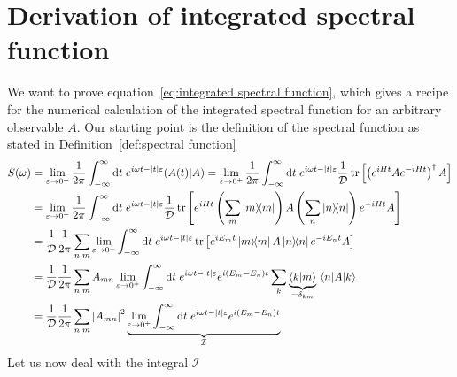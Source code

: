 \chapter{Derivation of integrated spectral function\label{app:spectral}}
\thispagestyle{chapterBeginStyle}
We want to prove equation~\eqref{eq:integrated spectral function}, which gives
a recipe for the numerical calculation of the integrated spectral function for an arbitrary observable \(A\).
Our starting point is the definition of the spectral function as stated in Definition~\ref{def:spectral function}
\begin{align}
        S(\omega) &=  \lim _{\varepsilon \to 0^+} \frac{1}{2 \pi} \int_{-\infty}^{\infty} \mathrm{d} t 
        \; e^{i \omega t-|t| \varepsilon}\hs{A(t)}{A} = \lim _{\varepsilon \to 0^+} \frac{1}{2 \pi}
        \int_{-\infty}^{\infty} \mathrm{d} t \; e^{i \omega t-|t| \varepsilon} \frac{1}{\dimension}
        \tr\left[\left(e^{iHt}Ae^{-iHt}\right)^{\dagger}A\right] \nonumber\\
        &=\lim _{\varepsilon \to 0^+} \frac{1}{2 \pi}
        \int_{-\infty}^{\infty} \mathrm{d} t \; e^{i \omega t-|t| \varepsilon} \frac{1}{\dimension}
        \tr\left[e^{iHt}\left(\sum_{m} \ketbra{m}{m}\right) 
        A\left(\sum_{n} \ketbra{n}{n}\right)e^{-iHt}A\right] \nonumber\\
        &= \frac{1}{\dimension} \frac{1}{2 \pi}\sum_{n,m} \lim _{\varepsilon \to 0^+} 
        \int_{-\infty}^{\infty} \mathrm{d} t \; e^{i \omega t-|t| \varepsilon}
        \tr\left[e^{i E_m t}\ketbra{m}{m} A\ketbra{n}{n}e^{-i E_n t}A\right] \nonumber\\
        &= \frac{1}{\dimension} \frac{1}{2 \pi}\sum_{n,m} A_{mn}  \lim _{\varepsilon \to 0^+} 
        \int_{-\infty}^{\infty} \mathrm{d} t \; e^{i \omega t-|t| \varepsilon}e^{i (E_m-E_n) t}
        \sum_{k} \underbrace{\braket{k}{m}}_{=\delta_{km}} \matrixel{n}{A}{k} \nonumber\\
        &= \frac{1}{\dimension} \frac{1}{2 \pi}\sum_{n,m} \abs{A_{mn}}^2  \underbrace{\lim _{\varepsilon 
        \to 0^+} \int_{-\infty}^{\infty} \mathrm{d} t \; e^{i \omega t-|t| 
        \varepsilon}e^{i (E_m-E_n) t}}_{\mathcal{I}}\label{eq:spectral function simplified}
\end{align}
Let us now deal with the integral \(\mathcal{I}\)
